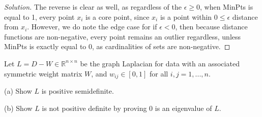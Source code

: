 \documentclass[10pt]{article}
\newenvironment{problem}[2][]{\begin{trivlist}
\item[\hskip \labelsep {\bfseries #1}\hskip \labelsep {\bfseries #2.}]}{\end{trivlist}}
\begin{document}
\begin{proof}[Solution]
The reverse is clear as well, as regardless of the $\epsilon \geq 0$, when MinPts is equal to 1, every point $x_i$ is a core point, since $x_i$ is a point within $0 \leq \epsilon$ distance from $x_i$. However, we do note the edge case for if $\epsilon < 0$, then because distance functions are non-negative, every point remains an outlier regardless, unless MinPts is exactly equal to 0, as cardinalities of sets are non-negative.

\end{proof}

\begin{problem}{Question 2}

Let $L = D - W \in \mathbb{R}^{n \times n}$ be the graph Laplacian for data with an associated symmetric weight matrix $W$, and $w_{ij} \in [0,1]$ for all $i,j = 1,...,n$.

(a) Show $L$ is positive semidefinite.

(b) Show $L$ is not positive definite by proving $0$ is an eigenvalue of $L$.

\end{problem}
\end{document}
